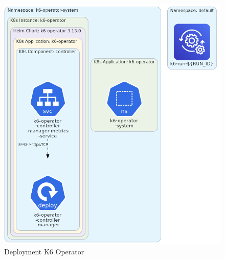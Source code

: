 \begin{figure}[htbp]
    \centering
    \includegraphics[width=1\textwidth]{resources/chapter-4/k6-operator.png}
    \caption{Deployment K6 Operator}
    \label{fig:deployment-k6-operator}
\end{figure}

\pagebreak